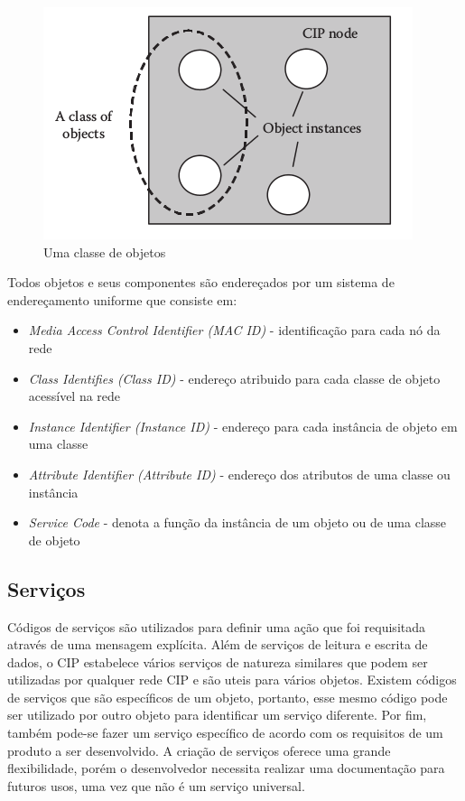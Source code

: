 \begin{figure}[H]
\centering
\includegraphics[width=.4\textwidth]{imagens/classedeobje}
\caption{ Uma classe de objetos \cite{book:zur}}
\label{im::classobj}
\end{figure}

Todos objetos e seus componentes são endereçados por um sistema de endereçamento uniforme que consiste em:

\begin{itemize}
\item {\it Media Access Control Identifier (MAC ID)} - identificação para cada nó da rede
\item {\it Class Identifies (Class ID)} - endereço atribuido para cada classe de objeto acessível na rede
\item {\it Instance Identifier (Instance ID)} - endereço para cada instância de objeto em uma classe
\item {\it Attribute Identifier (Attribute ID)} - endereço dos atributos de uma classe ou instância
\item {\it Service Code} - denota a função da instância de um objeto ou de uma classe de objeto
\end{itemize}

\subsection{Serviços}

Códigos de serviços são utilizados para definir uma ação que foi requisitada através de uma mensagem explícita. Além de serviços de leitura e escrita de dados, o CIP estabelece vários serviços de natureza similares que podem ser utilizadas por qualquer rede CIP e são uteis para vários objetos. Existem códigos de serviços que são específicos de um objeto, portanto, esse mesmo código pode ser utilizado por outro objeto para identificar um serviço diferente. Por fim, também pode-se fazer um serviço específico de acordo com os requisitos de um produto a ser desenvolvido. A criação de serviços oferece uma grande flexibilidade, porém o desenvolvedor necessita realizar uma documentação para futuros usos, uma vez que não é um serviço universal.

